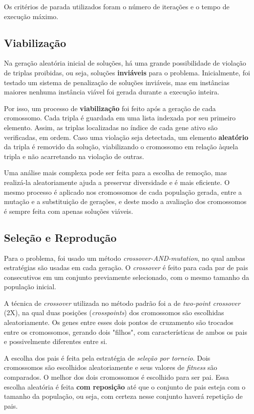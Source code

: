 \documentclass{MO824}
\begin{document}
Os critérios de parada utilizados foram o número de iterações e o tempo de execução máximo.

\subsection{Viabilização}
Na geração aleatória inicial de soluções, há uma grande possibilidade de violação de triplas proibidas, ou seja, soluções \textbf{inviáveis} para o problema. Inicialmente, foi testado um sistema de penalização de soluções inviáveis, mas em instâncias maiores nenhuma instância viável foi gerada durante a execução inteira.

Por isso, um processo de \textbf{viabilização} foi feito após a geração de cada cromossomo. Cada tripla é guardada em uma lista indexada por seu primeiro elemento. Assim, as triplas localizadas no índice de cada gene ativo são verificadas, em ordem. Caso uma violação seja detectada, um elemento \textbf{aleatório} da tripla é removido da solução, viabilizando o cromossomo em relação àquela tripla e não acarretando na violação de outras.

Uma análise mais complexa pode ser feita para a escolha de remoção, mas realizá-la aleatoriamente ajuda a preservar diversidade e é mais eficiente. O mesmo processo é aplicado nos cromossomos de cada população gerada, entre a mutação e a substituição de gerações, e deste modo a avaliação dos cromossomos é sempre feita com apenas soluções viáveis.

\subsection{Seleção e Reprodução}
Para o problema, foi usado um método \textit{crossover-AND-mutation}, no qual ambas estratégias são usadas em cada geração. O \textit{crossover} é feito para cada par de pais consecutivos em um conjunto previamente selecionado, com o mesmo tamanho da população inicial.

A técnica de \textit{crossover} utilizada no método padrão foi a de \textit{two-point crossover} (2X), na qual duas posições (\textit{crosspoints}) dos cromossomos são escolhidas aleatoriamente. Os genes entre esses dois pontos de cruzamento são trocados entre os cromossomos, gerando dois "filhos", com características de ambos os pais e possivelmente diferentes entre si. 

A escolha dos pais é feita pela estratégia de \textit{seleção por torneio}. Dois cromossomos são escolhidos aleatoriamente e seus valores de \textit{fitness} são comparados. O melhor dos dois cromossomos é escolhido para ser pai. Essa escolha aleatória é feita \textbf{com reposição} até que o conjunto de pais esteja com o tamanho da população, ou seja, com certeza nesse conjunto haverá repetição de pais.
\end{document}
